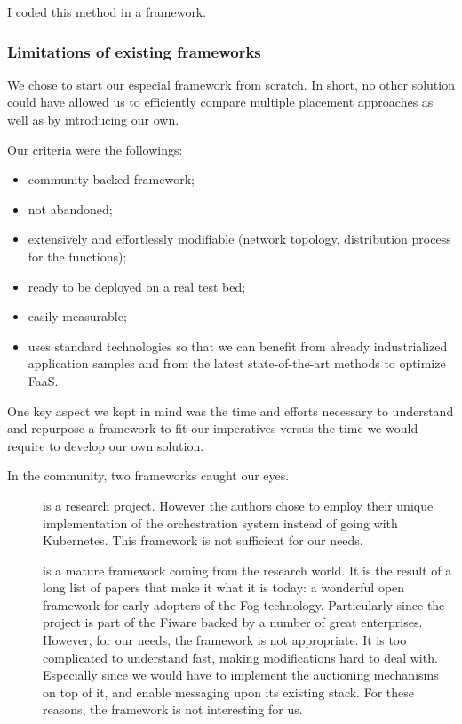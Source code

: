\documentclass[11pt]{sdm}
\begin{document}
I coded this method in a framework.

\subsubsection{Limitations of existing frameworks}

We chose to start our especial framework from scratch. In short, no other solution could have allowed us to efficiently compare multiple placement approaches as well as by introducing our own.

Our criteria were the followings:
\begin{itemize}
	\item community-backed framework;
	\item not abandoned;
	\item extensively and effortlessly modifiable (network topology, distribution process for the functions);
	\item ready to be deployed on a real test bed;
	\item easily measurable;
	\item uses standard technologies so that we can benefit from already industrialized application samples and from the latest state-of-the-art methods to optimize \gls{FaaS}.
\end{itemize}

One key aspect we kept in mind was the time and efforts necessary to understand and repurpose a framework to fit our imperatives versus the time we would require to develop our own solution.

In the community, two frameworks caught our eyes.
\begin{description}
	\item[\cite{deng_fogbus2_2021}]{is a research project. However the authors chose to employ their unique implementation of the orchestration system instead of going with Kubernetes. This framework is not sufficient for our needs.
	}
	\item[\cite{smartfog_fogflow_2022}]{ is a mature framework coming from the research world. It is the result of a long list of papers  that make it what it is today: a wonderful open framework for early adopters of the Fog technology. Particularly since the project is part of the Fiware  backed by a number of great enterprises. However, for our needs, the framework is not appropriate. It is too complicated to understand fast, making modifications hard to deal with. Especially since we would have to implement the auctioning mechanisms on top of it, and enable messaging upon its existing stack. For these reasons, the framework is not interesting for us.}
\end{description}
\end{document}
